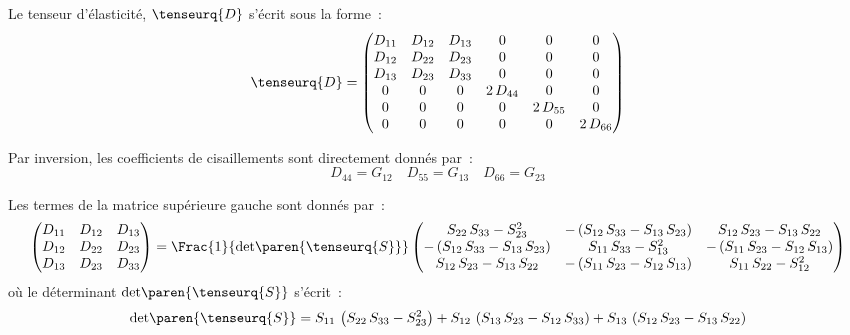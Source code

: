 \documentclass[rectoverso,pleiades,pstricks,leqno,anti]{texmf/note_technique_2010}
\begin{document}
Le tenseur d'élasticité, \(\tenseurq{D}\) s'écrit sous la forme~:
\[
\tenseurq{D}=
\begin{pmatrix}
  D_{11} & D_{12} & D_{13} & 0 & 0 & 0 \\
  D_{12} & D_{22} & D_{23} & 0 & 0 & 0 \\
  D_{13} & D_{23} & D_{33} & 0 & 0 & 0 \\
  0 & 0 & 0 & 2\,D_{44} & 0  & 0 \\
  0 & 0 & 0 & 0        & 2\,D_{55} & 0 \\
  0 & 0 & 0 & 0        & 0 & 2\, D_{66} \\
\end{pmatrix}
\]

Par inversion, les coefficients de cisaillements sont directement
donnés par~:
\[
D_{44}=G_{12} \quad D_{55}=G_{13} \quad D_{66}=G_{23}
\]

Les termes de la matrice supérieure gauche sont donnés par~:
\[
\begin{pmatrix}
  D_{11} & D_{12} & D_{13} \\
  D_{12} & D_{22} & D_{23} \\
  D_{13} & D_{23} & D_{33} \\
\end{pmatrix} = 
\Frac{1}{\text{det}\paren{\tenseurq{S}}}
\begin{pmatrix}
  S_{22}\,S_{33}-S_{23}^2&-\left(S_{12}\,S_{33}-S_{13}\,S_{23}\right)& S_{12}\,S_{23}-S_{13}\,S_{22}\\
  -\left(S_{12}\,S_{33}-S_{13}\,S_{23}\right)&S_{11}\,S_{33}-S_{13}^2&-\left(S_{11}\,S_{23}-S_{12}\,S_{13}\right)\\
  S_{12}\,S_{23}-S_{13}\,S_{22}&-\left(S_{11}\,S_{23}-S_{12}\,S_{13}\right)&S_{11}\,S_{22}-S_{12}^2\\ 
\end{pmatrix}
\]
où le déterminant \(\text{det}\paren{\tenseurq{S}}\) s'écrit~:
\[
\text{det}\paren{\tenseurq{S}} = 
S_{11}\,\left(S_{22}\,S_{33}-S_{23}^2\right)+
S_{12}\,\left(S_{13}\,S_{23}-S_{12}\,S_{33}\right)+
S_{13}\,\left(S_{12}\,S_{23}-S_{13}\,S_{22}\right)
\]


\end{document}
